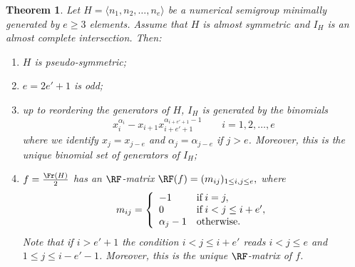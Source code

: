 \documentclass[11pt,twoside]{amsart}
\def\al{\alpha}
\newtheorem{thm}[Theorem]{Theorem}
\theoremstyle{definition}
\numberwithin{equation}{section}
\begin{document}
\begin{thm}\label{forwardmainTh}
Let $H=\langle n_1, n_2, \ldots, n_e\rangle$ be a numerical semigroup
minimally generated by $e\ge 3$ elements. 
Assume that $H$ is almost symmetric  and $I_H$ is an almost complete intersection.
Then:
\begin{enumerate}
\item $H$ is  pseudo-symmetric;
\item $e=2e'+1$ is odd;
\item up to reordering the generators of $H$,
$I_H$ is generated by the binomials
\[
x_i^{\al_i} - x_{i+1}{x_{i+e'+1}^{\al_{i+e'+1}-1}} \qquad  i = 1,2 ,\ldots, e \]
where we identify $x_j = x_{j-e}$ and $\al_j =\al_{j-e}$ if $j> e$.
Moreover, this is the unique binomial set of generators of $I_H$; 
\item $f=\frac{\Fr(H)}{2}$ has an $\RF$-matrix
$\RF(f) = (m_{ij})_{1\le i, j \le e},$
where 
\[ m_{ij} = \left\{
\begin{array}{ll}
-1 & {\rm if\, } i=j, \\
0  &  {\rm if \,} i < j \le i+e', \\
\al_j-1 & {\rm otherwise}.
\end{array}
\right.
\]
Note that if $i > e' +1$ the condition $i < j \le i+e'$ reads $i<j \le e$ and $1\le j\le i-e'-1$.  
Moreover, this is the unique $\RF$-matrix of $f$.
\end{enumerate}
\end{thm}
\end{document}
